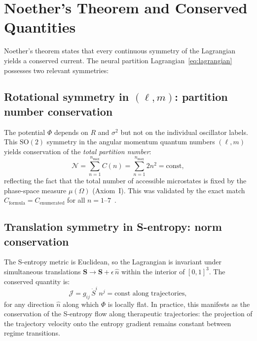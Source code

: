 \documentclass[twocolumn,aps,prl,superscriptaddress,floatfix]{revtex4-2}
\newcommand{\Pot}{\Phi}
\newcommand{\Svec}{\mathbf{S}}
\begin{document}
\section{Noether's Theorem and Conserved Quantities}
\label{sec:noether}

Noether's theorem states that every continuous symmetry of the Lagrangian yields a conserved current.
The neural partition Lagrangian~\eqref{eq:lagrangian} possesses two relevant symmetries:

\subsection{Rotational symmetry in $(\ell, m)$: partition number conservation}

The potential $\Pot$ depends on $R$ and $\sigma^2$ but not on the individual oscillator labels.
This $\mathrm{SO}(2)$ symmetry in the angular momentum quantum numbers $(\ell, m)$ yields conservation of the \emph{total partition number}:
\begin{equation}
\mathcal{N} = \sum_{n=1}^{n_{\max}} C(n) = \sum_{n=1}^{n_{\max}} 2n^2 = \text{const},
\label{eq:partition_conservation}
\end{equation}
reflecting the fact that the total number of accessible microstates is fixed by the phase-space measure $\mu(\Omega)$ (Axiom~I).
This was validated by the exact match $C_{\mathrm{formula}} = C_{\mathrm{enumerated}}$ for all $n = 1$--$7$~\cite{sachikonye2026operator}.

\subsection{Translation symmetry in S-entropy: norm conservation}

The S-entropy metric is Euclidean, so the Lagrangian is invariant under simultaneous translations $\Svec \to \Svec + \epsilon\,\hat{n}$ within the interior of $[0,1]^3$.
The conserved quantity is:
\begin{equation}
\mathcal{J} = g_{ij}\,\dot{S}^i\,n^j = \text{const along trajectories},
\label{eq:J_conservation}
\end{equation}
for any direction $\hat{n}$ along which $\Pot$ is locally flat.
In practice, this manifests as the conservation of the S-entropy flow along therapeutic trajectories: the projection of the trajectory velocity onto the entropy gradient remains constant between regime transitions.
\end{document}
